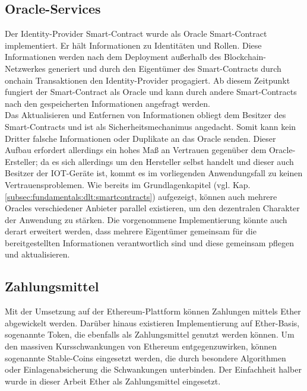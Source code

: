 \subsection{Oracle-Services}
\label{subsec:implementation:requirements:oracle}
Der Identity-Provider Smart-Contract wurde als Oracle Smart-Contract implementiert. Er hält Informationen zu Identitäten und Rollen. Diese Informationen werden nach dem Deployment außerhalb des Blockchain-Netzwerkes generiert und durch den Eigentümer des Smart-Contracts durch onchain Transaktionen den Identity-Provider progagiert. Ab diesem Zeitpunkt fungiert der Smart-Contract als Oracle und kann durch andere Smart-Contracts nach den gespeicherten Informationen angefragt werden.\\
Das Aktualisieren und Entfernen von Informationen obliegt dem Besitzer des Smart-Contracts und ist als Sicherheitsmechanimus angedacht. Somit kann kein Dritter falsche Informationen oder Duplikate an das Oracle senden. Dieser Aufbau erfordert allerdings ein hohes Maß an Vertrauen gegenüber dem Oracle-Ersteller; da es sich allerdings um den Hersteller selbst handelt und dieser auch Besitzer der \ac{IOT}-Geräte ist, kommt es im vorliegenden Anwendungsfall zu keinen Vertrauensproblemen. Wie bereits im Grundlagenkapitel (vgl. Kap. \ref{subsec:fundamentals:dlt:smartcontracts}) aufgezeigt, können auch mehrere Oracles verschiedener Anbieter parallel existieren, um den dezentralen Charakter der Anwendung zu stärken. Die vorgenommene Implementierung könnte auch derart erweitert werden, dass mehrere Eigentümer gemeinsam für die bereitgestellten Informationen verantwortlich sind und diese gemeinsam pflegen und aktualisieren.

\subsection{Zahlungsmittel}
\label{subsec:implementation:requirements:payment}
Mit der Umsetzung auf der Ethereum-Plattform können Zahlungen mittels Ether abgewickelt werden. Darüber hinaus existieren Implementierung auf Ether-Basis, sogenannte Token, die ebenfalls als Zahlungsmittel genutzt werden können. Um den massiven Kursschwankungen von Ethereum entgegenzuwirken, können sogenannte Stable-Coins eingesetzt werden, die durch besondere Algorithmen oder Einlagenabsicherung die Schwankungen unterbinden. Der Einfachheit halber wurde in dieser Arbeit Ether als Zahlungsmittel eingesetzt.\\

